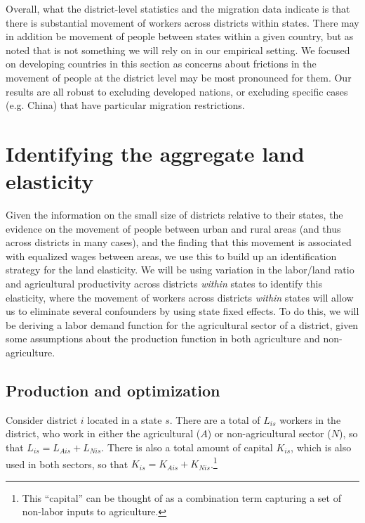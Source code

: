 \documentclass[12pt]{article}
\begin{document}
Overall, what the district-level statistics and the migration data indicate is that there is substantial movement of workers across districts within states. There may in addition be movement of people between states within a given country, but as noted that is not something we will rely on in our empirical setting. We focused on developing countries in this section as concerns about frictions in the movement of people at the district level may be most pronounced for them. Our results are all robust to excluding developed nations, or excluding specific cases (e.g. China) that have particular migration restrictions.

\section{Identifying the aggregate land elasticity}\label{SEC_agmodel}
Given the information on the small size of districts relative to their states, the evidence on the movement of people between urban and rural areas (and thus across districts in many cases), and the finding that this movement is associated with equalized wages between areas, we use this to build up an identification strategy for the land elasticity. We will be using variation in the labor/land ratio and agricultural productivity across districts \textit{within} states to identify this elasticity, where the movement of workers across districts \textit{within} states will allow us to eliminate several confounders by using state fixed effects. To do this, we will be deriving a labor demand function for the agricultural sector of a district, given some assumptions about the production function in both agriculture and non-agriculture.

\subsection{Production and optimization}
Consider district $i$ located in a state $s$. There are a total of $L_{is}$ workers in the district, who work in either the agricultural ($A$) or non-agricultural sector ($N$), so that $L_{is} = L_{Ais} + L_{Nis}$. There is also a total amount of capital $K_{is}$, which is also used in both sectors, so that $K_{is} = K_{Ais} + K_{Nis}$.\footnote{This ``capital'' can be thought of as a combination term capturing a set of non-labor inputs to agriculture.}
\end{document}

